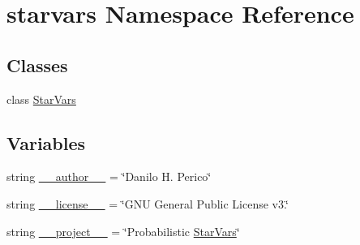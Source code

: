 \hypertarget{namespacestarvars}{\section{starvars Namespace Reference}
\label{namespacestarvars}
}
\subsection*{Classes}
\begin{DoxyCompactItemize}
\item 
class \hyperlink{classstarvars_1_1StarVars}{Star\-Vars}
\end{DoxyCompactItemize}
\subsection*{Variables}
\begin{DoxyCompactItemize}
\item 
string \hyperlink{namespacestarvars_ac644d7f280f95cccc18a5d57a812e131}{\-\_\-\-\_\-author\-\_\-\-\_\-} = \char`\"{}Danilo H. Perico\char`\"{}
\item 
string \hyperlink{namespacestarvars_a1264921cafa3bfaea6a08a307416bbc6}{\-\_\-\-\_\-license\-\_\-\-\_\-} = \char`\"{}G\-N\-U General Public License v3.\char`\"{}
\item 
string \hyperlink{namespacestarvars_afabb4c7baf270d344e2640778b38e5ff}{\-\_\-\-\_\-project\-\_\-\-\_\-} = \char`\"{}Probabilistic \hyperlink{classstarvars_1_1StarVars}{Star\-Vars}\char`\"{}
\end{DoxyCompactItemize}


